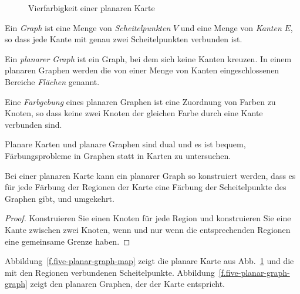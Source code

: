 \begin{figure}[t]
\begin{minipage}{.45\textwidth}
\caption{Vierfarbigkeit einer planaren Karte}\label{f.five-planar-map-four}
\end{minipage}
\end{figure}

\begin{definition}
Ein \emph{Graph} ist eine Menge von \emph{Scheitelpunkten} $V$ und eine Menge von \emph{Kanten} $E$, so dass jede Kante mit genau zwei Scheitelpunkten verbunden ist.

Ein \emph{planarer Graph} ist ein Graph, bei dem sich keine Kanten kreuzen. In einem planaren Graphen werden die von einer Menge von Kanten eingeschlossenen Bereiche \emph{Flächen} genannt.

Eine \emph{Farbgebung} eines planaren Graphen ist eine Zuordnung von Farben zu Knoten, so dass keine zwei Knoten der gleichen Farbe durch eine Kante verbunden sind.
\end{definition}

Planare Karten und planare Graphen sind dual und es ist bequem, Färbungsprobleme in Graphen statt in Karten zu untersuchen.

\begin{theorem}
Bei einer planaren Karte kann ein planarer Graph so konstruiert werden, dass es für jede Färbung der Regionen der Karte eine Färbung der Scheitelpunkte des Graphen gibt, und umgekehrt.
\end{theorem}

\begin{proof}
Konstruieren Sie einen Knoten für jede Region und konstruieren Sie eine Kante zwischen zwei Knoten, wenn und nur wenn die entsprechenden Regionen eine gemeinsame Grenze haben. 
\end{proof}

\begin{example}
Abbildung~\ref{f.five-planar-graph-map} zeigt die planare Karte aus Abb.~\ref{f.five-planar-map-four} und die mit den Regionen verbundenen Scheitelpunkte. Abbildung~\ref{f.five-planar-graph-graph} zeigt den planaren Graphen, der der Karte entspricht.
\end{example}

